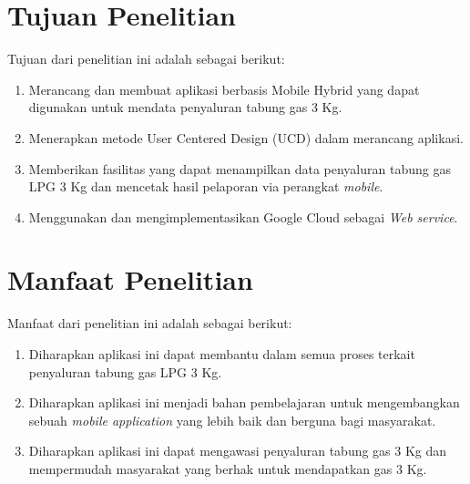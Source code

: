 \section{Tujuan Penelitian}
Tujuan dari penelitian ini adalah sebagai berikut:
\begin{enumerate}
	\item Merancang dan membuat aplikasi berbasis Mobile Hybrid yang dapat digunakan untuk mendata penyaluran tabung gas 3 Kg.
	\item Menerapkan metode User Centered Design (UCD) dalam merancang aplikasi. 
	\item Memberikan fasilitas yang dapat menampilkan data penyaluran tabung gas LPG 3 Kg dan mencetak hasil pelaporan via perangkat \textit{mobile}.
	\item Menggunakan dan mengimplementasikan Google Cloud sebagai \textit{Web
		service}.
\end{enumerate}


\section{Manfaat Penelitian}
Manfaat dari penelitian ini adalah sebagai berikut:
\begin{enumerate}
	\item Diharapkan aplikasi ini dapat membantu dalam semua proses terkait penyaluran tabung gas LPG 3 Kg.
	\item Diharapkan aplikasi ini menjadi bahan pembelajaran untuk mengembangkan sebuah \textit{mobile application} yang lebih baik dan berguna bagi masyarakat.
	\item Diharapkan aplikasi ini dapat mengawasi penyaluran tabung gas 3 Kg dan mempermudah masyarakat yang berhak untuk mendapatkan gas 3 Kg.
\end{enumerate}


\begin{comment}

\end{comment}
